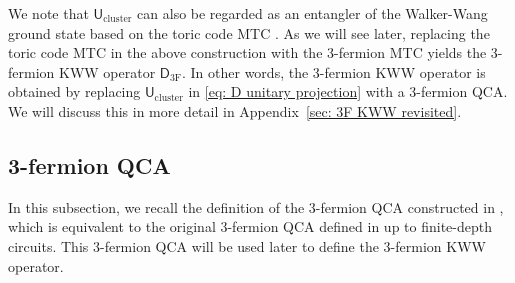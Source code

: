 \documentclass[aps,twocolumn,prx,floatfix,preprintnumbers, nofootinbib,10pt]{revtex4-2}
\numberwithin{equation}{section}
\theoremstyle{definition}
\theoremstyle{remark}
\theoremstyle{claim}
\renewcommand{\sf}[1]{\mathsf{#1}}
\begin{document}
\vspace*{\baselineskip}
We note that $\sf{U}_{\mathrm{cluster}}$ can also be regarded as an entangler of the Walker-Wang ground state based on the toric code MTC \cite{Roberts:2020zmk}.
As we will see later, replacing the toric code MTC in the above construction with the 3-fermion MTC yields the 3-fermion KWW operator $\mathsf{D}_\text{3F}$.
In other words, the 3-fermion KWW operator is obtained by replacing $\sf{U}_{\mathrm{cluster}}$ in \eqref{eq: D unitary projection} with a 3-fermion QCA.
We will discuss this in more detail in Appendix~\ref{sec: 3F KWW revisited}.


\subsection{3-fermion QCA}
\label{sec: 3-fermion QCA 2-qubit version}
In this subsection, we recall the definition of the 3-fermion QCA constructed in \cite{Shirley_2022, MengSun2026}, which is equivalent to the original 3-fermion QCA defined in \cite{HaahFidkowskiHastings2023} up to finite-depth circuits.
This 3-fermion QCA will be used later to define the 3-fermion KWW operator.
\end{document}
